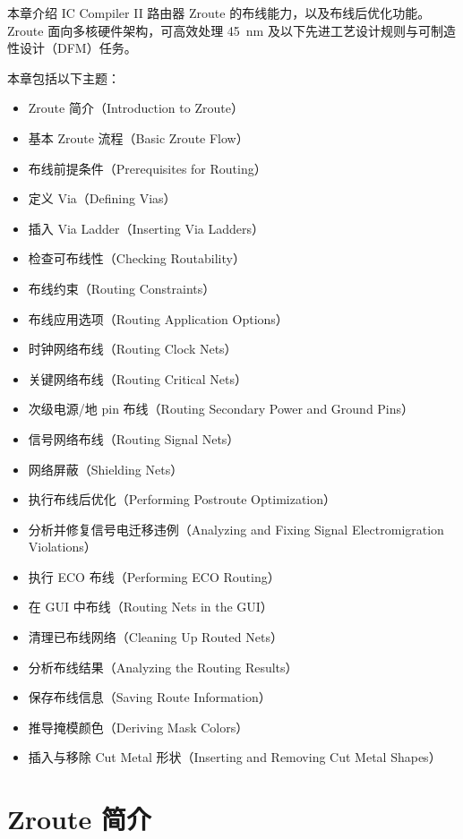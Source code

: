 \label{chap:route}

本章介绍 IC Compiler II 路由器 Zroute 的布线能力，以及布线后优化功能。Zroute 面向多核硬件架构，可高效处理 45~nm 及以下先进工艺设计规则与可制造性设计（DFM）任务。

本章包括以下主题：
\begin{itemize}
  \item Zroute 简介（Introduction to Zroute）
  \item 基本 Zroute 流程（Basic Zroute Flow）
  \item 布线前提条件（Prerequisites for Routing）
  \item 定义 Via（Defining Vias）
  \item 插入 Via Ladder（Inserting Via Ladders）
  \item 检查可布线性（Checking Routability）
  \item 布线约束（Routing Constraints）
  \item 布线应用选项（Routing Application Options）
  \item 时钟网络布线（Routing Clock Nets）
  \item 关键网络布线（Routing Critical Nets）
  \item 次级电源/地 pin 布线（Routing Secondary Power and Ground Pins）
  \item 信号网络布线（Routing Signal Nets）
  \item 网络屏蔽（Shielding Nets）
  \item 执行布线后优化（Performing Postroute Optimization）
  \item 分析并修复信号电迁移违例（Analyzing and Fixing Signal Electromigration Violations）
  \item 执行 ECO 布线（Performing ECO Routing）
  \item 在 GUI 中布线（Routing Nets in the GUI）
  \item 清理已布线网络（Cleaning Up Routed Nets）
  \item 分析布线结果（Analyzing the Routing Results）
  \item 保存布线信息（Saving Route Information）
  \item 推导掩模颜色（Deriving Mask Colors）
  \item 插入与移除 Cut Metal 形状（Inserting and Removing Cut Metal Shapes）
\end{itemize}

\section{Zroute 简介}
